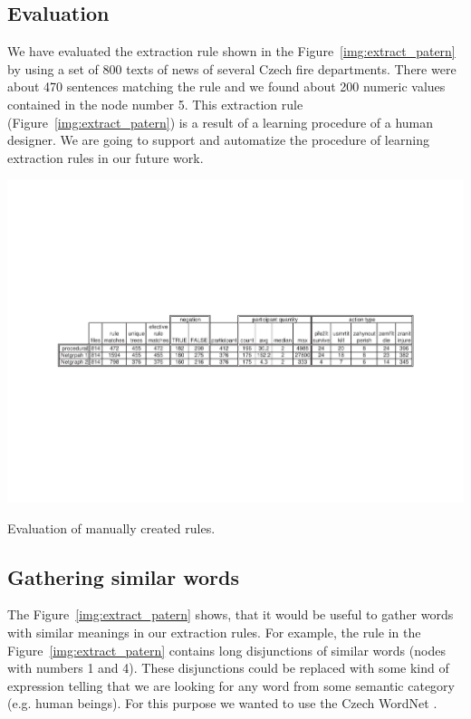 \subsection{Evaluation}
We have evaluated the extraction rule shown in the Figure~\ref{img:extract_patern} by using a set of 800 texts of news of several Czech fire departments. There were about 470 sentences matching the rule and we found about 200 numeric values contained in the node number 5. This extraction rule (Figure~\ref{img:extract_patern}) is a result of a learning procedure of a human designer. We are going to support and automatize the procedure of learning extraction rules in our future work.








\begin{table}
	\centering
		\includegraphics[angle=-90,width=\hsize]{../img/ch3_tab_manual_rules}
	\caption{Evaluation of manually created rules.}
	\label{tab:ch3_tab_manual_rules}
\end{table}







\subsection{Gathering similar words}

The Figure~\ref{img:extract_patern} shows, that it would be useful to gather words with similar meanings in our extraction rules. For example, the rule in the Figure~\ref{img:extract_patern} contains long disjunctions of similar words (nodes with numbers 1 and 4). These disjunctions could be replaced with some kind of expression telling that we are looking for any word from some semantic category (e.g. human beings). For this purpose we wanted to use the Czech WordNet \citep{biblio:WordNetCZ2004}. 

